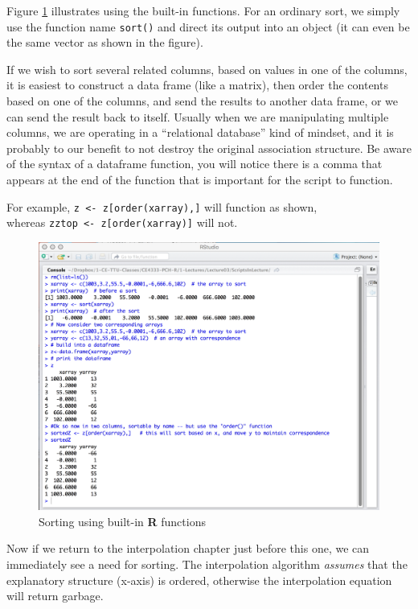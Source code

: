 Figure \ref{fig:BuiltInRSorts.jpg} illustrates using the built-in functions.  
For an ordinary sort, we simply use the function name \texttt{sort()} and direct its output into an object (it can even be the same vector as shown in the figure). 

If we wish to sort several related columns, based on values in one of the columns, it is easiest to construct a data frame (like a matrix), then order the contents based on one of the columns, and send the results to another data frame, or we can send the result back to itself.  Usually when we are manipulating multiple columns, we are operating in a ``relational database'' kind of mindset, and it is probably to our benefit to not destroy the original association structure.  Be aware of the syntax of a dataframe function, you will notice there is a comma that appears at the end of the function that is important for the script to function.

For example, \texttt{z <- z[order(xarray),]} will function as shown, \\ whereas \texttt{zztop <- z[order(xarray)]} will not.

\begin{figure}[h!] %
   \centering
   \includegraphics[width=6in]{./3-Sorting/BuiltInRSorts.jpg} 
   \caption{Sorting using built-in \textbf{R} functions}
   \label{fig:BuiltInRSorts.jpg}
\end{figure}

Now if we return to the interpolation chapter just before this one, we can immediately see a need for sorting.  The interpolation algorithm \textit{assumes} that the explanatory structure (x-axis) is ordered, otherwise the interpolation equation will return garbage.


